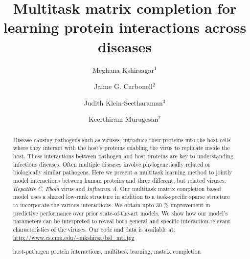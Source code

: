 \documentclass[runningheads,a4paper]{llncs}
\newcommand{\keywords}[1]{\par\addvspace\baselineskip
\noindent\keywordname\enspace\ignorespaces#1}
\begin{document}
\pagestyle{headings}

\mainmatter  

\title{Multitask matrix completion for learning protein interactions across diseases}


\author{Meghana Kshirsagar$^{1}$%
\and Jaime G. Carbonell$^{2}$
\and Judith Klein-Seetharaman$^{3}$
\and Keerthiram Murugesan$^{2}$}



\maketitle

\begin{abstract}

Disease causing pathogens such as viruses, introduce their proteins into the host cells 
where they interact with the host's proteins enabling the virus to replicate inside the host.
These interactions between pathogen and host proteins are key to understanding infectious diseases.
Often multiple diseases involve phylogenetically related or biologically similar pathogens. Here we present a multitask learning method to jointly model interactions between human proteins and three different, but related viruses: \textit{Hepatitis C}, \textit{Ebola} virus and \textit{Influenza A}. 
Our multitask matrix completion based model uses a shared low-rank structure in addition to a task-specific sparse structure to incorporate the various interactions.
We obtain upto 30 \% improvement in predictive performance over prior state-of-the-art models. 
We show how our model's parameters can be interpreted to reveal both general and specific
interaction-relevant characteristics of the viruses. Our code and data is available at: \url{http://www.cs.cmu.edu/~mkshirsa/bsl_mtl.tgz}
\keywords{host-pathogen protein interactions, multitask learning, matrix completion}
\end{abstract}
\end{document}
